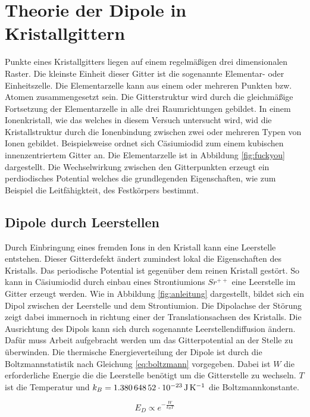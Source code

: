 \section{Theorie der Dipole in Kristallgittern}
\label{sec:theorie}

Punkte eines Kristallgitters liegen auf einem regelmäßigen drei dimensionalen Raster. Die kleinste Einheit dieser Gitter ist die sogenannte
Elementar- oder Einheitszelle. Die Elementarzelle kann aus einem oder mehreren Punkten bzw. Atomen zusammengesetzt sein.  Die Gitterstruktur
wird durch die gleichmäßige Fortsetzung der Elementarzelle in alle drei Raumrichtungen gebildet. In einem Ionenkristall, wie das welches in
diesem Versuch untersucht wird, wid die Kristallstruktur durch die Ionenbindung zwischen zwei oder mehreren Typen von Ionen gebildet.
Beispielsweise ordnet sich Cäsiumiodid zum einem kubischen innenzentriertem Gitter an. Die Elementarzelle ist in Abbildung \ref{fig:fuckyou}
dargestellt. Die Wechselwirkung zwischen den Gitterpunkten erzeugt ein perdiodisches Potential welches die grundlegenden Eigenschaften, wie
zum Beispiel die Leitfähigkteit, des Festkörpers bestimmt.


\subsection{Dipole durch Leerstellen}

Durch Einbringung eines fremden Ions in den Kristall kann eine Leerstelle entstehen.  Dieser Gitterdefekt ändert zumindest lokal die
Eigenschaften des Kristalls. Das periodische Potential ist gegenüber dem reinen Kristall gestört.  So kann in Cäsiumiodid durch einbau eines
Strontiumions \( Sr^{++} \) eine Leerstelle im Gitter erzeugt werden. Wie in Abbildung \ref{fig:anleitung} dargestellt, bildet sich
ein Dipol zwischen der Leerstelle und dem Strontiumion. Die Dipolachse der Störung zeigt dabei immernoch in richtung einer der Translationsachsen
des Kristalls. Die Ausrichtung des Dipols kann sich durch sogenannte Leerstellendiffusion ändern. Dafür muss Arbeit aufgebracht werden um das
Gitterpotential an der Stelle zu überwinden. Die thermische Energieverteilung der Dipole ist durch die Boltzmannstatistik nach Gleichung
\ref{eq:boltzmann} vorgegeben. Dabei ist $W$ die erforderliche Energie die die Leerstelle benötigt um die Gitterstelle zu wechseln. $T$ ist
die Temperatur und $k_B = \SI{1,38064852E-23}{\joule \per \kelvin}$ die Boltzmannkonstante.

\begin{equation}
  \label{eq:boltzmann}
  E_D \propto e^{- \frac{W}{k_B T}}
\end{equation}

